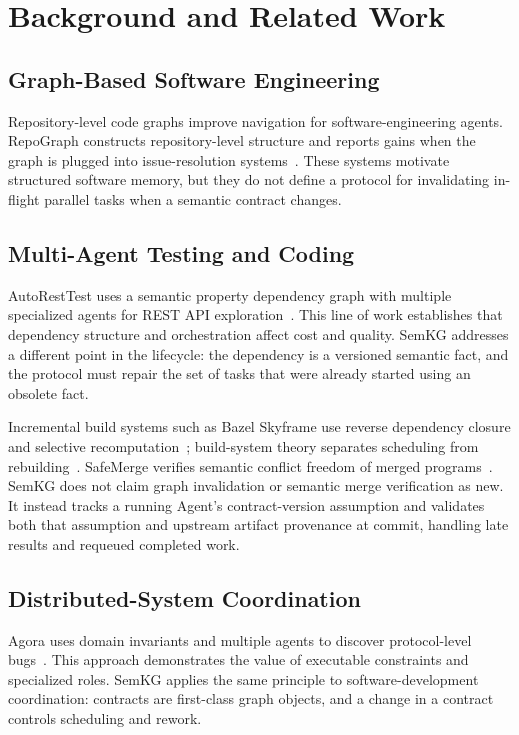 \documentclass[a4paper,runningheads]{llncs}
\begin{document}
\section{Background and Related Work}
\subsection{Graph-Based Software Engineering}
Repository-level code graphs improve navigation for software-engineering agents. RepoGraph constructs repository-level structure and reports gains when the graph is plugged into issue-resolution systems~\cite{repograph}. These systems motivate structured software memory, but they do not define a protocol for invalidating in-flight parallel tasks when a semantic contract changes.

\subsection{Multi-Agent Testing and Coding}
AutoRestTest uses a semantic property dependency graph with multiple specialized agents for REST API exploration~\cite{autoresttest}. This line of work establishes that dependency structure and orchestration affect cost and quality. SemKG addresses a different point in the lifecycle: the dependency is a versioned semantic fact, and the protocol must repair the set of tasks that were already started using an obsolete fact.

Incremental build systems such as Bazel Skyframe use reverse dependency closure and selective recomputation~\cite{bazel}; build-system theory separates scheduling from rebuilding~\cite{buildsystems}. SafeMerge verifies semantic conflict freedom of merged programs~\cite{safemerge}. SemKG does not claim graph invalidation or semantic merge verification as new. It instead tracks a running Agent's contract-version assumption and validates both that assumption and upstream artifact provenance at commit, handling late results and requeued completed work.

\subsection{Distributed-System Coordination}
Agora uses domain invariants and multiple agents to discover protocol-level bugs~\cite{agora}. This approach demonstrates the value of executable constraints and specialized roles. SemKG applies the same principle to software-development coordination: contracts are first-class graph objects, and a change in a contract controls scheduling and rework.
\end{document}
